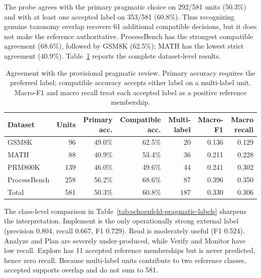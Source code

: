 The probe agrees with the primary pragmatic choice on 292/581 units (50.3\%)
and with at least one accepted label on 353/581 (60.8\%).  Thus recognizing
genuine taxonomy overlap recovers 61 additional compatible decisions, but it
does not make the reference authoritative.  ProcessBench has the strongest
compatible agreement (68.6\%), followed by GSM8K (62.5\%); MATH has the
lowest strict agreement (40.9\%).  Table~\ref{tab:schoenfeld-pragmatic-transfer}
reports the complete dataset-level results.

\begin{table}[t]
\centering
\caption{Agreement with the provisional pragmatic review.  Primary accuracy
requires the preferred label; compatible accuracy accepts either label on a
multi-label unit.  Macro-F1 and macro recall treat each accepted label as a
positive reference membership.  }
\label{tab:schoenfeld-pragmatic-transfer}
\begin{tabular}{lrrrrrr}
\toprule
Dataset & Units & Primary acc. & Compatible acc. & Multi-label & Macro-F1 & Macro recall \\
\midrule
GSM8K        &  96 & 49.0\% & 62.5\% & 20 & 0.136 & 0.129 \\
MATH         &  88 & 40.9\% & 53.4\% & 36 & 0.211 & 0.228 \\
PRM800K      & 139 & 46.0\% & 49.6\% & 44 & 0.241 & 0.302 \\
ProcessBench & 258 & 56.2\% & 68.6\% & 87 & 0.396 & 0.350 \\
\midrule
Total        & 581 & 50.3\% & 60.8\% & 187 & 0.330 & 0.306 \\
\bottomrule
\end{tabular}
\end{table}

The class-level comparison in Table~\ref{tab:schoenfeld-pragmatic-labels}
sharpens the interpretation.  Implement is the only operationally strong
external label (precision 0.804, recall 0.667, F1 0.729).  Read is moderately
useful (F1 0.524).  Analyze and Plan are severely under-produced, while
Verify and Monitor have low recall.  Explore has 11 accepted reference
memberships but is never predicted, hence zero recall.  Because multi-label
units contribute to two reference classes, accepted supports overlap and do
not sum to 581.

